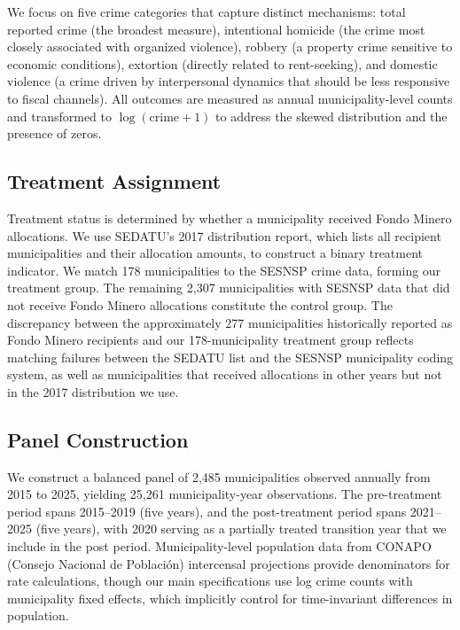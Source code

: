 \documentclass[12pt]{article}
\begin{document}
We focus on five crime categories that capture distinct mechanisms: total reported crime (the broadest measure), intentional homicide (the crime most closely associated with organized violence), robbery (a property crime sensitive to economic conditions), extortion (directly related to rent-seeking), and domestic violence (a crime driven by interpersonal dynamics that should be less responsive to fiscal channels). All outcomes are measured as annual municipality-level counts and transformed to $\log(\text{crime} + 1)$ to address the skewed distribution and the presence of zeros.

\subsection{Treatment Assignment}

Treatment status is determined by whether a municipality received Fondo Minero allocations. We use SEDATU's 2017 distribution report, which lists all recipient municipalities and their allocation amounts, to construct a binary treatment indicator. We match 178 municipalities to the SESNSP crime data, forming our treatment group. The remaining 2,307 municipalities with SESNSP data that did not receive Fondo Minero allocations constitute the control group. The discrepancy between the approximately 277 municipalities historically reported as Fondo Minero recipients and our 178-municipality treatment group reflects matching failures between the SEDATU list and the SESNSP municipality coding system, as well as municipalities that received allocations in other years but not in the 2017 distribution we use.

\subsection{Panel Construction}

We construct a balanced panel of 2,485 municipalities observed annually from 2015 to 2025, yielding 25,261 municipality-year observations. The pre-treatment period spans 2015--2019 (five years), and the post-treatment period spans 2021--2025 (five years), with 2020 serving as a partially treated transition year that we include in the post period. Municipality-level population data from CONAPO (Consejo Nacional de Poblaci\'{o}n) intercensal projections provide denominators for rate calculations, though our main specifications use log crime counts with municipality fixed effects, which implicitly control for time-invariant differences in population.
\end{document}
